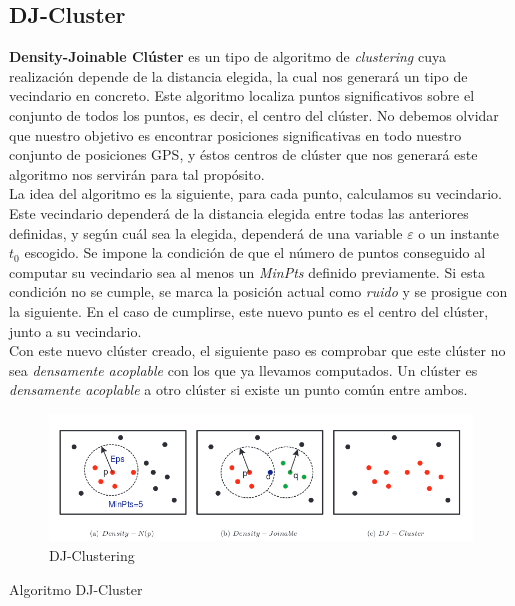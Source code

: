 \documentclass[a4paper, 12pt]{article}
\begin{document}
\pagebreak
\subsection{DJ-Cluster}

\textbf{Density-Joinable Cl\'uster}\cite{importantPlaces} es un tipo de algoritmo de \textit{clustering} cuya realizaci\'on depende de la distancia elegida, la cual nos generar\'a un tipo de vecindario en concreto. Este algoritmo localiza puntos significativos sobre el conjunto de todos los puntos, es decir, el centro del cl\'uster. No debemos olvidar que nuestro objetivo es encontrar posiciones significativas en todo nuestro conjunto de posiciones GPS, y \'estos centros de cl\'uster que nos generar\'a este algoritmo nos servir\'an para tal prop\'osito. \\

La idea del algoritmo es la siguiente, para cada punto, calculamos su vecindario. Este vecindario depender\'a de la distancia elegida entre todas las anteriores definidas, y seg\'un cu\'al sea la elegida, depender\'a de una variable $\varepsilon$ o un instante $t_0$ escogido. Se impone la condici\'on de que el n\'umero de puntos conseguido al computar su vecindario sea al menos un \textit{MinPts} definido previamente. Si esta condici\'on no se cumple, se marca la posici\'on actual como \textit{ruido} y se prosigue con la siguiente. En el caso de cumplirse, este nuevo punto es el centro del cl\'uster, junto a su vecindario.  \\

Con este nuevo cl\'uster creado, el siguiente paso es comprobar que este cl\'uster no sea \textit{densamente acoplable} con los que ya llevamos computados. Un cl\'uster es \textit{densamente acoplable} a otro cl\'uster si existe un punto com\'un entre ambos. \\

\begin{figure}[!htbp]
\centering
	\includegraphics[scale=.7]{djcluster.png}
\caption{DJ-Clustering}
\end{figure}

\begin{algorithm}[!htbp]\label{djCluster}
\begin{algorithmic}[1]
		\Else
		\EndIf
	\EndFor
\end{algorithmic}
\caption{\label{alg:djcluster} Algoritmo DJ-Cluster}
\end{algorithm}
\end{document}
